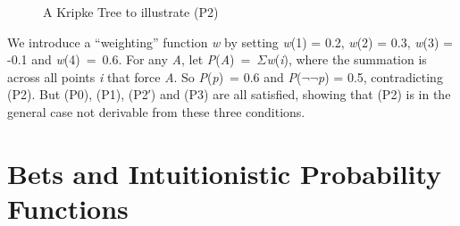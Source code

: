 \documentclass[
  11pt,
  letterpaper,
  DIV=11,
  numbers=noendperiod,
  twoside]{scrartcl}
\begin{document}
\begin{figure}


\caption{\label{fig-kripke}A Kripke Tree to illustrate (P2)}

\end{figure}%

We introduce a ``weighting'' function \emph{w} by setting \emph{w}(1) =
0.2, \emph{w}(2) = 0.3, \emph{w}(3) = -0.1 and \emph{w}(4)~=~0.6. For
any \emph{A}, let \emph{P}(\emph{A})~=~\({\Sigma}\)\emph{w}(\emph{i}),
where the summation is across all points \emph{i} that force \emph{A}.
So \emph{P}(\emph{p})~= 0.6 and \emph{P}(\({\lnot}{\lnot}\)\emph{p}) =
0.5, contradicting (P2). But (P0), (P1), (P2′) and (P3) are all
satisfied, showing that (P2) is in the general case not derivable from
these three conditions.

\section{Bets and Intuitionistic Probability
Functions}\label{bets-and-intuitionistic-probability-functions}
\end{document}
